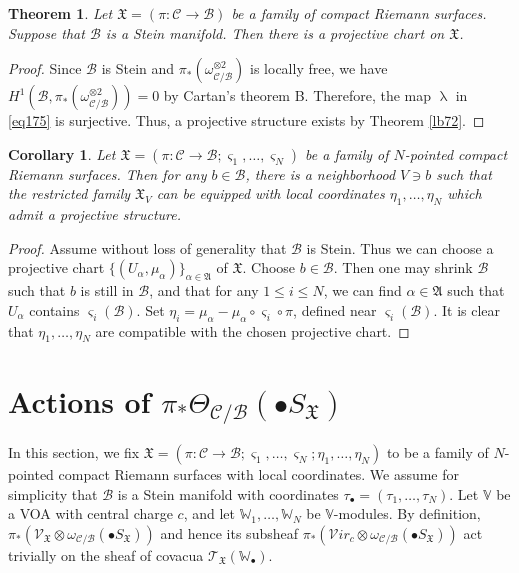 \documentclass[12pt,a4paper,notitlepage]{report}
\theoremstyle{definition}
\theoremstyle{plain}
\newtheorem{thm}[df]{Theorem}
\newtheorem{co}[df]{Corollary}
\newcommand{\fk}{\mathfrak}
\newcommand{\mc}{\mathcal}
\newcommand{\scr}{\mathscr}
\newcommand{\sgm}{\varsigma}
\newcommand{\blt}{\bullet}
\newcommand{\Vbb}{\mathbb V}
\newcommand{\Wbb}{\mathbb W}
\newcommand{\svir}{\mathcal V\!\mathit{ir}}
\numberwithin{equation}{section}
\begin{document}
\begin{thm}\label{lb71}
Let $\fk X=(\pi:\mc C\rightarrow\mc B)$ be a family of compact Riemann surfaces. Suppose that $\mc B$ is a Stein manifold. Then there is a projective chart on $\fk X$.
\end{thm}




\begin{proof}
Since $\mc B$ is Stein and $\pi_*(\omega_{\mc C/\mc B}^{\otimes 2})$ is locally free, we have $H^1(\mc B,\pi_*(\omega_{\mc C/\mc B}^{\otimes 2}))=0$ by Cartan's theorem B. Therefore, the map $\uplambda$ in \eqref{eq175} is surjective. Thus, a projective structure exists by Theorem \ref{lb72}.
\end{proof}











\begin{co}
Let $\fk X=(\pi:\mc C\rightarrow\mc B;\sgm_1,\dots,\sgm_N)$ be a family of $N$-pointed compact Riemann surfaces. Then for any $b\in\mc B$, there is a neighborhood $V\ni b$ such that the restricted family $\fk X_V$ can be equipped with local coordinates $\eta_1,\dots,\eta_N$ which admit a projective structure.
\end{co}



\begin{proof}
Assume without loss of generality that $\mc B$ is Stein. Thus we can choose a projective chart $\{(U_\alpha,\mu_\alpha)\}_{\alpha\in\fk A}$ of $\fk X$. Choose $b\in \mc B$. Then one may shrink $\mc B$ such that $b$ is still in $\mc B$, and that for any $1\leq i\leq N$, we can find $\alpha\in\fk A$ such that $U_\alpha$ contains $\sgm_i(\mc B)$. Set $\eta_i=\mu_\alpha-\mu_\alpha\circ\sgm_i\circ\pi$, defined near $\sgm_i(\mc B)$. It is clear that $\eta_1,\dots,\eta_N$ are compatible with the chosen projective chart.
\end{proof}




\section{Actions of $\pi_*\Theta_{\mc C/\mc B}(\blt S_{\fk X})$}\label{lb139}


In this section, we fix  $\fk X=(\pi:\mc C\rightarrow\mc B;\sgm_1,\dots,\sgm_N;\eta_1,\dots,\eta_N)$ to be a family of $N$-pointed compact Riemann surfaces with local coordinates. We assume for simplicity that $\mc B$ is a Stein manifold with coordinates $\tau_\blt=(\tau_1,\dots,\tau_N)$. Let $\Vbb$ be a VOA with central charge $c$, and let $\Wbb_1,\dots,\Wbb_N$ be $\Vbb$-modules. By definition, $\pi_*(\scr V_{\fk X}\otimes\omega_{\mc C/\mc B}(\blt S_{\fk X}))$ and hence its subsheaf $\pi_*(\svir_c\otimes\omega_{\mc C/\mc B}(\blt S_{\fk X}))$ act trivially on the sheaf of covacua $\scr T_{\fk X}(\Wbb_\blt)$.
\end{document}
